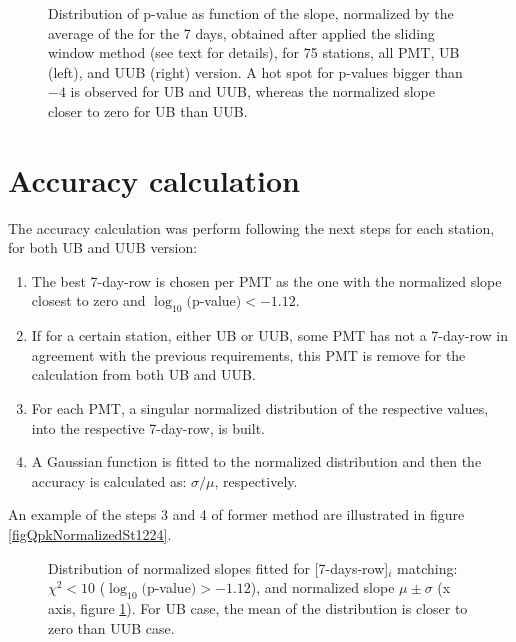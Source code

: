 \documentclass[twoside, final, 10pt]{articleMine}
\begin{document}
\begin{figure}[!t]
  \label{figLogPvalVsSlop}
  \centering
  \caption{Distribution of p-value as function of the slope,
  normalized by the average of the \qpkvem for the 7 days,
  obtained after applied the sliding window method (see text for
  details), for 75 stations, all PMT, UB (left), and UUB (right)
  version. A hot spot for p-values bigger than $-4$ is observed
  for UB and UUB, whereas the normalized slope closer to zero for
  UB than UUB.}
  \label{figLogPvalVsSlop}
\end{figure}
\section{Accuracy calculation}

The accuracy calculation was perform following the next steps for
each station, for both UB and UUB version:
\begin{enumerate}
  \item The best 7-day-row is chosen per PMT as the one with the
    normalized slope closest to zero and
    $\log_{10}($p-value$)<-1.12$.
  \item If for a certain station, either UB or UUB, some PMT has
    not a 7-day-row in agreement with the previous requirements,
    this PMT is remove for the calculation from both UB and UUB.
  \item For each PMT, a singular normalized distribution of the
    respective \qpkvem values, into the respective 7-day-row, is
    built.
  \item A Gaussian function is fitted to the normalized
    distribution and then the accuracy is calculated as:
    $\sigma/\mu$, respectively.
\end{enumerate}
An example of the steps 3 and 4 of former method are illustrated
in figure \ref{figQpkNormalizedSt1224}.
\clearpage


\begin{figure}[!t]
  \label{figProjSlop}
  \centering
  \caption{Distribution of normalized slopes fitted for
  [7-days-row]$_i$ matching: $\chi^2<10$
  ($\log_{10}($p-value$)>-1.12$), and normalized slope
  $\mu\pm\sigma$ (x axis, figure  \ref{figLogPvalVsSlop}). For UB
  case, the mean of the distribution is closer to zero than UUB
  case.}
  \label{figProjSlop}
\end{figure}
\end{document}

